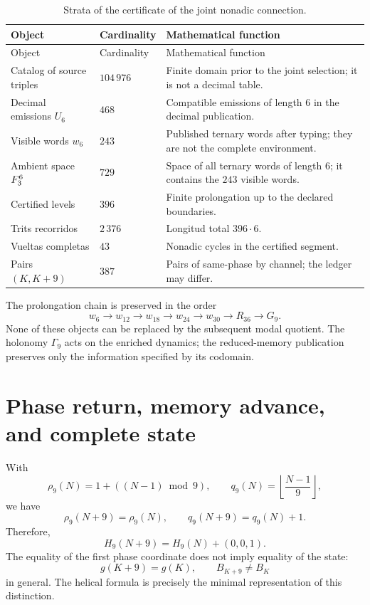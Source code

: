 \begin{longtable}{p{}p{}p{}}
\caption{Strata of the certificate of the joint nonadic connection.}
\label{espiral:tab:certificado-nonadico}\\
\toprule
Object&Cardinality&Mathematical function\\
\midrule
\endfirsthead
\toprule
Object&Cardinality&Mathematical function\\
\midrule
\endhead
Catalog of source triples&\(104\,976\)&Finite domain prior to the
joint selection; it is not a decimal table.\\
Decimal emissions \(U_6\)&\(468\)&Compatible emissions of length \(6\)
in the decimal publication.\\
Visible words \(w_6\)&\(243\)&Published ternary words after typing; they are not the complete environment.\\
Ambient space \(F_3^6\)&\(729\)&Space of all ternary words of
length \(6\); it contains the \(243\) visible words.\\
Certified levels&\(396\)&Finite prolongation up to the declared boundaries.\\
Trits recorridos&\(2\,376\)&Longitud total \(396\cdot6\).\\
Vueltas completas&\(43\)&Nonadic cycles in the certified segment.\\
Pairs \((K,K+9)\)&\(387\)&Pairs of same-phase by channel; the ledger may differ.\\
\bottomrule
\end{longtable}

The prolongation chain is preserved in the order
\[
 w_6\longrightarrow w_{12}\longrightarrow w_{18}
 \longrightarrow w_{24}\longrightarrow w_{30}
 \longrightarrow R_{36}\longrightarrow G_9.
\]
None of these objects can be replaced by the subsequent modal quotient.
The holonomy \(\Gamma_9\) acts on the enriched dynamics; the
reduced-memory publication preserves only the information specified
by its codomain.

\section{Phase return, memory advance, and complete state}

With
\[
 \rho_9(N)=1+((N-1)\bmod9),
 \qquad
 q_9(N)=\left\lfloor\frac{N-1}{9}\right\rfloor,
\]
we have
\[
 \rho_9(N+9)=\rho_9(N),
 \qquad q_9(N+9)=q_9(N)+1.
\]
Therefore,
\[
 H_9(N+9)=H_9(N)+(0,0,1).
\]
The equality of the first phase coordinate does not imply equality of the state:
\[
 g(K+9)=g(K),
 \qquad B_{K+9}\neq B_K
\]
in general. The helical formula is precisely the minimal representation
of this distinction.

